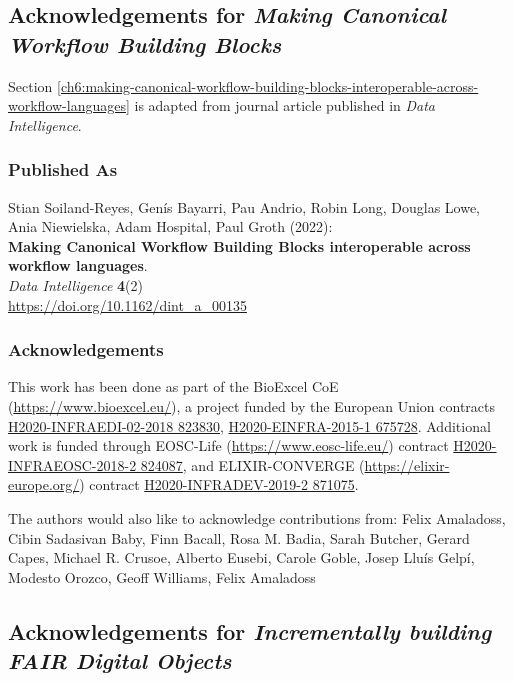 \subsection{Acknowledgements for \emph{Making Canonical Workflow Building Blocks}}

Section \vref{ch6:making-canonical-workflow-building-blocks-interoperable-across-workflow-languages} is adapted from journal article published in \emph{Data Intelligence}.

\subsubsection*{Published As}

Stian Soiland-Reyes, Genís Bayarri, Pau Andrio, Robin Long, Douglas
Lowe, Ania Niewielska, Adam Hospital, Paul Groth (2022):\\
\textbf{Making Canonical Workflow Building Blocks interoperable across
workflow languages}.\\
\emph{Data Intelligence} \textbf{4}(2)\\
\url{https://doi.org/10.1162/dint_a_00135}

\hypertarget{acknowledgements-3}{%
\subsubsection*{Acknowledgements}}

This work has been done as part of the BioExcel CoE
(\url{https://www.bioexcel.eu/}), a project funded by the European Union
contracts
\href{https://cordis.europa.eu/project/id/823830}{H2020-INFRAEDI-02-2018
823830},
\href{https://cordis.europa.eu/project/id/675728}{H2020-EINFRA-2015-1
675728}. Additional work is funded through EOSC-Life
(\url{https://www.eosc-life.eu/}) contract
\href{https://cordis.europa.eu/project/id/824087}{H2020-INFRAEOSC-2018-2
824087}, and ELIXIR-CONVERGE (\url{https://elixir-europe.org/}) contract
\href{https://cordis.europa.eu/project/id/871075}{H2020-INFRADEV-2019-2
871075}.

The authors would also like to acknowledge contributions from: Felix
Amaladoss, Cibin Sadasivan Baby, Finn Bacall, Rosa M. Badia, Sarah
Butcher, Gerard Capes, Michael R. Crusoe, Alberto Eusebi, Carole Goble,
Josep Lluís Gelpí, Modesto Orozco, Geoff Williams, Felix Amaladoss



\subsection{Acknowledgements for \emph{Incrementally building FAIR Digital Objects}}


